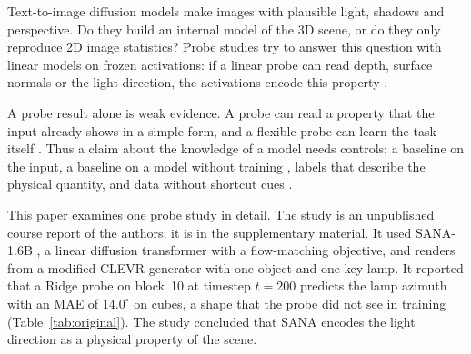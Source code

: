 \documentclass[10pt]{article}
\newcommand{\degr}{^\circ}
\begin{document}
Text-to-image diffusion models make images with plausible light, shadows and perspective.
Do they build an internal model of the 3D scene, or do they only reproduce 2D image statistics?
Probe studies try to answer this question with linear models on frozen activations: if a linear probe can read depth, surface normals or the light direction, the activations encode this property \citep{alain2016probes,chen2023beyond,elbanani2024probing,zhan2024protocol}.

A probe result alone is weak evidence.
A probe can read a property that the input already shows in a simple form, and a flexible probe can learn the task itself \citep{hewitt2019control,belinkov2022probing}.
Thus a claim about the knowledge of a model needs controls: a baseline on the input, a baseline on a model without training \citep{adebayo2018sanity}, labels that describe the physical quantity, and data without shortcut cues \citep{geirhos2019texture}.

This paper examines one probe study in detail.
The study is an unpublished course report of the authors; it is in the supplementary material.
It used SANA-1.6B \citep{xie2025sana}, a linear diffusion transformer with a flow-matching objective, and renders from a modified CLEVR generator \citep{johnson2017clevr} with one object and one key lamp.
It reported that a Ridge probe on block~10 at timestep $t=200$ predicts the lamp azimuth with an MAE of $14.0\degr$ on cubes, a shape that the probe did not see in training (Table~\ref{tab:original}).
The study concluded that SANA encodes the light direction as a physical property of the scene.
\end{document}
